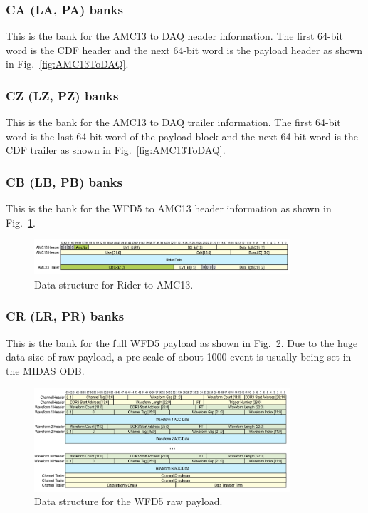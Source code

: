 \subsubsection*{CA (LA, PA) banks}

This is the bank for the AMC13 to DAQ header information.
The first 64-bit word is the CDF header and the next 64-bit word is the payload header as shown in Fig.~\ref{fig:AMC13ToDAQ}.

\subsubsection*{CZ (LZ, PZ) banks}

This is the bank for the AMC13 to DAQ trailer information.
The first 64-bit word is the last 64-bit word of the payload block and the next 64-bit word is the CDF trailer as shown in Fig.~\ref{fig:AMC13ToDAQ}.


\subsubsection*{CB (LB, PB) banks}

This is the bank for the WFD5 to AMC13 header information as shown in Fig.~\ref{fig:RiderToAMC13}.

\begin{figure}[htbp]
\centering
\includegraphics[width=0.85\textwidth]{pics/RiderToAMC13.pdf} 
\caption{Data structure for Rider to AMC13.}\label{fig:RiderToAMC13}
\end{figure}

\subsubsection*{CR (LR, PR) banks}

This is the bank for the full WFD5 payload as shown in Fig.~\ref{fig:RiderData}. Due to the huge data size of raw payload, a pre-scale of about 1000 event is usually being set in the MIDAS ODB.

\begin{figure}[htbp]
\centering
\includegraphics[width=0.85\textwidth]{pics/RiderData.pdf} 
\caption{Data structure for the WFD5 raw payload.}\label{fig:RiderData}
\end{figure}


